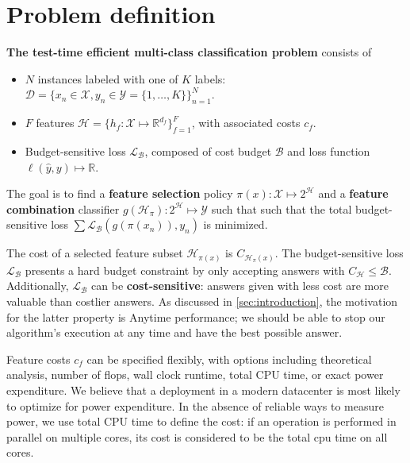 \section{Problem definition}\label{sec:clf_problem}

\begin{mydef} \label{def:clf_problem}
\textbf{The test-time efficient multi-class classification problem} consists of

\begin{itemize}
    \item $N$ instances labeled with one of $K$ labels: ${\mathcal{D} = \{x_n \in \mathcal{X}, y_n \in \mathcal{Y} = \{1, \dots, K\}\}_{n=1}^N}$.
    \item $F$ features $\mathcal{H} = \{h_f : \mathcal{X} \mapsto \mathbb{R}^{d_f} \}_{f=1}^F$, with associated costs $c_f$.
    \item Budget-sensitive loss $\mathcal{L}_\mathcal{B}$, composed of cost budget $\mathcal{B}$ and loss function ${\ell(\hat{y}, y) \mapsto \mathbb{R}}$.
\end{itemize}

The goal is to find a \textbf{feature selection} policy $\pi(x): \mathcal{X} \mapsto 2^\mathcal{H}$ and a \textbf{feature combination} classifier $g(\mathcal{H}_\pi) : 2^\mathcal{H} \mapsto \mathcal{Y}$ such that such that the total budget-sensitive loss $\sum \mathcal{L}_\mathcal{B}(g(\pi(x_n)), y_n)$ is minimized.
\end{mydef}

The cost of a selected feature subset $\mathcal{H}_{\pi(x)}$ is $C_{\mathcal{H}_\pi(x)}$.
The budget-sensitive loss $\mathcal{L}_\mathcal{B}$ presents a hard budget constraint by only accepting answers with $C_{\mathcal{H}} \leq \mathcal{B}$.
Additionally, $\mathcal{L}_\mathcal{B}$ can be \textbf{cost-sensitive}: answers given with less cost are more valuable than costlier answers.
As discussed in \autoref{sec:introduction}, the motivation for the latter property is Anytime performance; we should be able to stop our algorithm's execution at any time and have the best possible answer.

Feature costs $c_f$ can be specified flexibly, with options including theoretical analysis, number of flops, wall clock runtime, total CPU time, or exact power expenditure.
We believe that a deployment in a modern datacenter is most likely to optimize for power expenditure.
In the absence of reliable ways to measure power, we use total CPU time to define the cost: if an operation is performed in parallel on multiple cores, its cost is considered to be the total cpu time on all cores.

